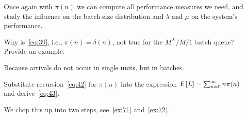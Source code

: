 Once again with $\pi(n)$ we can compute all performance measures we need, and study the influence on the batch size distribution and $\lambda$ and $\mu$ on the system's performance.

\begin{exercise}
  Why is~\cref{eq:39}, i.e., $\pi(n)=\delta(n)$, not true for the $M^X/M/1$ batch queue?
  Provide an example.
\begin{solution}
 Because arrivals do not occur in single units, but in batches.
\end{solution}
\end{exercise}

\begin{exercise}\label{ex:73}
 Substitute recursion~\cref{eq:42} for $\pi(n)$ into the expression $\,\mathsf{E}\left[L\right] = \sum_{n=0}^\infty n \pi(n)$ and derive~\cref{eq:43}.
  \begin{solution}
    We chop this up into two steps, see~\cref{ex:71} and~\cref{ex:72}.
  \end{solution}
\end{exercise}

